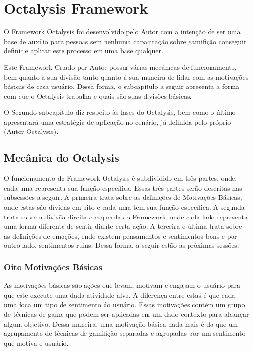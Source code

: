 \section{Octalysis Framework}
\label{sub:octalysisframework}
O Framework Octalysis foi desenvolvido pelo Autor com a intenção de ser uma
base de auxílio para pessoas sem nenhuma capacitação sobre gamifição
conseguir definir e aplicar este processo em uma base qualquer.

Este Framework Criado por Autor possui várias mecânicas de funcionamento,
bem quanto à sua divisão tanto quanto à sua maneira de lidar com as
motivações básicas de casa usuário. Dessa forma, o subcapítulo a seguir
apresenta a forma com que o Octalysis trabalha e quais são suas divisões básicas.

O Segundo subcapítulo diz respeito às fases do Octalysis, bem como o último
apresentará uma estratégia de aplicação no cenário, já definida pelo próprio
(Autor Octalysis).


\subsection{Mecânica do Octalysis}
\label{sub:mecanicaoctalysis}
O funcionamento do Framework Octalysis é subdividido em três partes, onde,
cada uma representa sua função específica. Essas três partes serão descritas
nas subsessões a seguir. A primeira trata sobre as definições de Motivações
Básicas, onde estas são dívidas em oito e cada uma tem sua função específica.
A segunda trata sobre a divisão direita e esquerda do Framework, onde cada
lado representa uma forma diferente de sentir diante certa ação.
A terceira e última trata sobre as definições de emoções, onde existem
pensamentos e sentimentos bons e por outro lado, sentimentos ruins.
Dessa forma, a seguir estão as próximas sessões.

\subsubsection{Oito Motivações Básicas}
\label{sub:oitomotivacoesbasicas}
As motivações básicas são ações que levam, motivam e engajam
o usuário para que este execute uma dada atividade alvo.
A diferença entre estas é que cada uma foca um tipo de sentimento
do usuário. Essas motivações contém um grupo de técnicas de game
que podem ser aplicadas em um dado contexto para alcançar algum
objetivo. Dessa maneira, uma motivação básica nada mais é do
que um agrupamento de técnicas de gamifição separadas e agrupadas
por um sentimento que motiva o usuário.

